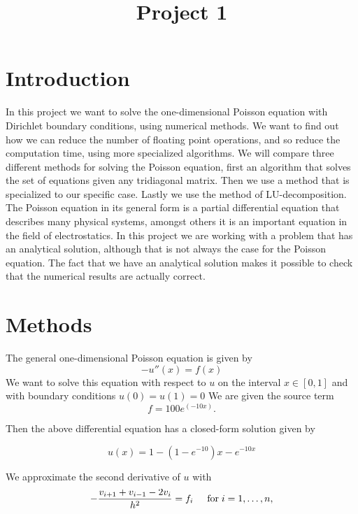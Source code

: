 \documentclass[12pt]{article}
\begin{document}
\title{Project 1}
\maketitle

\section{Introduction}

In this project we want to solve the one-dimensional Poisson equation with Dirichlet boundary conditions, using numerical methods. We want to find out how we can reduce the number of floating point operations, and so reduce the computation time, using more specialized  algorithms. We will compare three different methods for solving the Poisson equation, first an algorithm that solves the set of equations given any tridiagonal matrix. Then we use a method that is specialized to our specific case. Lastly we use the method of LU-decomposition. The Poisson equation in its general form is a  partial differential equation that describes many physical systems, amongst others it is an important equation in the field of electrostatics. In this project we are working with a problem that has an analytical solution, although that is not always the case for the Poisson equation.  The fact that we have an analytical solution makes it possible to check that the numerical results are actually correct. 

\section{Methods}\label{sec:meth}
The general one-dimensional Poisson equation is given by 
\begin{equation}
-u''(x) = f(x)
\end{equation}
We want to solve this equation with respect to $u$ on the interval $x \in [0,1]$ and with boundary conditions $u(0) = u(1) = 0$
\noindent We are given the source term 
\begin{equation}\label{eq:source}
f  = 100e^{(-10x)}. 
\end{equation}

\noindent Then the above differential equation has a closed-form  solution given by 

\begin{equation}\label{eq:closed}
u(x) = 1-(1-e^{-10})x-e^{-10x}
\end{equation}

\noindent We  approximate the second derivative of $u$ with 
\begin{equation}\label{eq:sec_der}
   -\frac{v_{i+1}+v_{i-1}-2v_i}{h^2} = f_i  \hspace{0.5cm} \mathrm{for} \hspace{0.1cm} i=1,\dots, n,
\end{equation}
\end{document}
